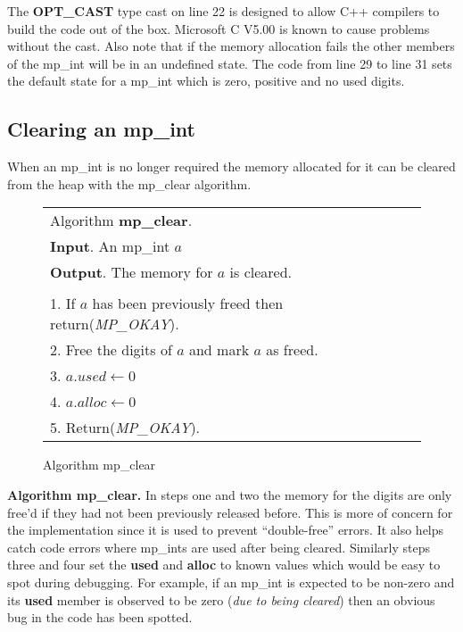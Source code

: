 \documentclass[b5paper]{book}
\begin{document}
The \textbf{OPT\_CAST} type cast on line 22 is designed to allow C++ compilers to build the code out of
the box.  Microsoft C V5.00 is known to cause problems without the cast.  Also note that if the memory
allocation fails the other members of the mp\_int will be in an undefined state.  The code from 
line 29 to line 31 sets the default state for a mp\_int which is zero, positive and no used digits.

\subsection{Clearing an mp\_int}
When an mp\_int is no longer required the memory allocated for it can be cleared from the heap with 
the mp\_clear algorithm.

\begin{figure}[here]
\begin{center}
\begin{tabular}{l}
\hline Algorithm \textbf{mp\_clear}. \\
\textbf{Input}.   An mp\_int $a$ \\
\textbf{Output}.  The memory for $a$ is cleared. \\
\hline \\
1.  If $a$ has been previously freed then return(\textit{MP\_OKAY}). \\
2.  Free the digits of $a$ and mark $a$ as freed. \\
3.  $a.used \leftarrow 0$ \\
4.  $a.alloc \leftarrow 0$ \\
5.  Return(\textit{MP\_OKAY}). \\
\hline
\end{tabular}
\end{center}
\caption{Algorithm mp\_clear}
\end{figure}

\textbf{Algorithm mp\_clear.}
In steps one and two the memory for the digits are only free'd if they had not been previously released before.  
This is more of concern for the implementation since it is used to prevent ``double-free'' errors.  It also helps catch
code errors where mp\_ints are used after being cleared.  Similarly steps three and four set the 
\textbf{used} and \textbf{alloc} to known values which would be easy to spot during debugging.  For example, if an mp\_int is expected
to be non-zero and its \textbf{used} member is observed to be zero (\textit{due to being cleared}) then an obvious bug in the code has been
spotted.
\end{document}
